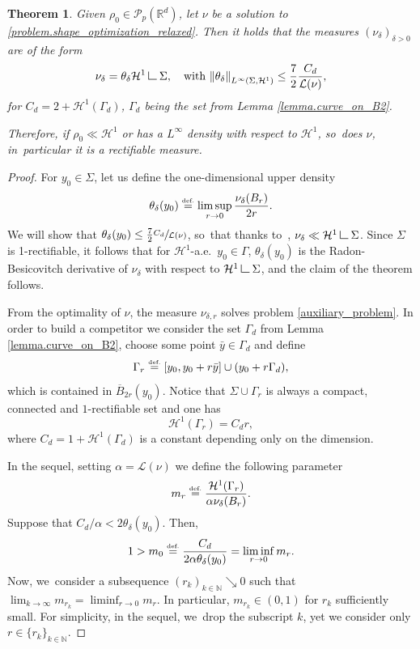 \documentclass[10pt]{amsart}
\newtheorem{theorem}{Theorem}[section]
\theoremstyle{definition}
\newcommand{\eqdef}{\ensuremath{\stackrel{\mbox{\upshape\tiny def.}}{=}}}
\newcommand{\norm}[1]{\left\lVert#1\right\rVert}
\newcommand\LM[1]{\hbox{\vrule width.5pt \vbox to#1pt{\vfill \hrule width#1pt height.5pt}}}
\newcommand\LL{{\mathchoice {\>\LM7\>}{\>\LM7\>}{\,\LM5\,}{\,\LM{3.35}\,}}}
\newcommand{\mres}{\LL}
\newcommand\cH{\mathcal{H}}
\newcommand\cL{\mathcal{L}}
\newcommand{\RR}{\mathbb{R}}
\begin{document}
\begin{theorem}\label{theorem.solutions_are_absolutely_continuous}
Given $\rho_0 \in \mathcal{P}_p(\RR^d)$, let $\nu$ be a solution to \eqref{problem.shape_optimization_relaxed}.
Then it holds that the measures $\left(\nu_\delta\right)_{\delta > 0}$ are of the form
\[
\nu_\delta = \theta_\delta \cH^1\mres \Sigma,
\quad\text{with $
\norm{\theta_\delta}_{L^\infty(\Sigma, \cH^1)}
\le
\frac{7}{2}\frac{C_d}{\mathcal{L}(\nu)}$,}
\]
for $C_d = 2 + \cH^1(\Gamma_d)$, $\Gamma_d$ being the set from Lemma \ref{lemma.curve_on_B2}.

Therefore,
if $\rho_0 \ll \cH^1$ or has a $L^{\infty}$ density with respect to $\cH^1$, so~does $\nu$, in~particular it is a rectifiable measure.
\end{theorem}

\begin{proof}
For $y_0 \in \Sigma$, let us define the one-dimensional upper density~\cite[Def.\,2.55]{ambrosio2000functions}
\begin{equation*}
\theta_\delta(y_0)\eqdef\limsup_{r \to 0} \frac{\nu_{\delta}(B_r)}{2r}.
\end{equation*}
We will show that $\theta_{\delta}(y_0)\leq \frac{7}{2}\sfrac{C_d}{\cL(\nu)}$, so~that thanks to~\cite[Th.\,2.56]{ambrosio2000functions}, $\nu_\delta \ll \cH^1\mres\Sigma$.
Since $\Sigma$ is 1-rectifiable, it follows that for $\cH^1$-a.e.~$y_0 \in \Gamma$, $\theta_\delta(y_0)$ is the Radon-Besicovitch
derivative of $\nu_\delta$ with respect to $\cH^1\mres\Sigma$, and the claim of the theorem follows.

From the optimality of $\nu$, the measure $\nu_{\delta,r}$ solves problem \eqref{auxiliary_problem}. In order to build a competitor we consider the set $\Gamma_d$ from Lemma \ref{lemma.curve_on_B2}, choose some point $\bar y \in \Gamma_d$ and define
\[
\Gamma_r
\eqdef
[y_0, y_0 + r\bar y]\cup
(y_0 + r\Gamma_d),
\]
which is contained in $\overline{B}_{2r}(y_0)$. Notice that $\Sigma \cup \Gamma_{r}$ is always a compact, connected and $1$-rectifiable set and one has
\[
\cH^1(\Gamma_{r})
=
C_dr,
\]
where $C_d = 1 + \cH^1(\Gamma_d)$ is a constant depending only on the dimension.

In the sequel, setting $\alpha = \mathcal{L}(\nu)$ we define the following parameter
\[
m_{r} \eqdef
\frac{\cH^1(\Gamma_r)}{\alpha \nu_\delta(B_r)}.\]
Suppose that $C_d/\alpha < 2\theta_{\delta}(y_0)$. Then,
\begin{equation*}
1> m_0\eqdef\frac{C_d}{2\alpha\theta_\delta(y_0)}= \liminf_{r \to 0} m_r.
\end{equation*}
Now, we~consider a subsequence $(r_{k})_{k\in \mathbb{N}}\searrow 0$ such that $\lim_{k \to \infty} m_{r_k}=\liminf_{r \to 0} m_r$. In particular, $m_{r_k} \in (0,1)$ for $r_k$ sufficiently small.
For simplicity, in the sequel, we~drop the subscript $k$, yet we consider only $r \in \{r_{k}\}_{k\in \mathbb{N}}$.


\end{proof}
\end{document}
